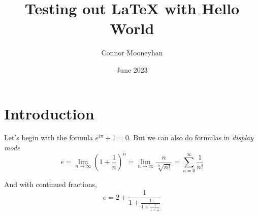 \documentclass{article}
\title{Testing out LaTeX with Hello World}
\author{Connor Mooneyhan}
\date{June 2023}
\begin{document}
\maketitle

\section{Introduction}
Let's begin with the formula $e^{i\pi}+1=0$. But we can also do formulas in \emph{display mode}
$$ e
    = \lim_{n\to\infty} \left(1+\frac{1}{n}\right)^n
    = \lim_{n\to\infty} \frac{n}{\sqrt[n]{n!}}
    = \sum_{n=0}^{\infty}\frac{1}{n!}
$$

And with continued fractions,
$$ e = 2 + \frac{1}{1 + \frac{1}{1 + \frac{1}{1 + \frac{1}{...}}}} $$
\end{document}
